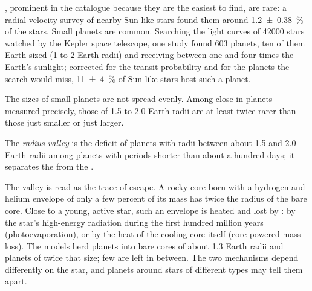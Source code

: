 , prominent in the catalogue because they are the easiest to
find, are rare: a radial-velocity survey of nearby Sun-like stars found
them around \qty[separate-uncertainty=true]{1.2 \pm 0.38}{\percent} of the stars. Small planets are
common. Searching the light curves of \num{42000} stars watched by the
Kepler space telescope, one study found 603 planets, ten of them Earth-sized (1 to 2
Earth radii) and receiving between one and four times the Earth's
sunlight; corrected for the transit probability and for the planets the
search would miss, \qty[separate-uncertainty=true]{11 \pm 4}{\percent} of Sun-like stars host such a
planet.

The sizes of small planets are not spread evenly. Among close-in planets
measured precisely, those of 1.5 to 2.0 Earth radii are at least twice
rarer than those just smaller or just larger.

\begin{definition}\label{def:b3:exoplanets:radius-valley}
The \emph{radius valley} is the deficit of planets
with radii between about 1.5 and 2.0 Earth radii among planets with
periods shorter than about a hundred days; it separates the 
from the .
\end{definition}

The valley is read as the trace of escape. A rocky core born with a
hydrogen and helium envelope of only a few percent of its mass has twice
the radius of the bare core. Close to a young, active star, such an
envelope is heated and lost by : by the star's
high-energy radiation during the first hundred million years
(photoevaporation), or by the heat of the cooling core itself (core-powered
mass loss). The models herd planets into bare cores of about 1.3 Earth
radii and planets of twice that size; few are left in between. The two
mechanisms depend differently on the star, and planets around stars of
different types may tell them apart.


